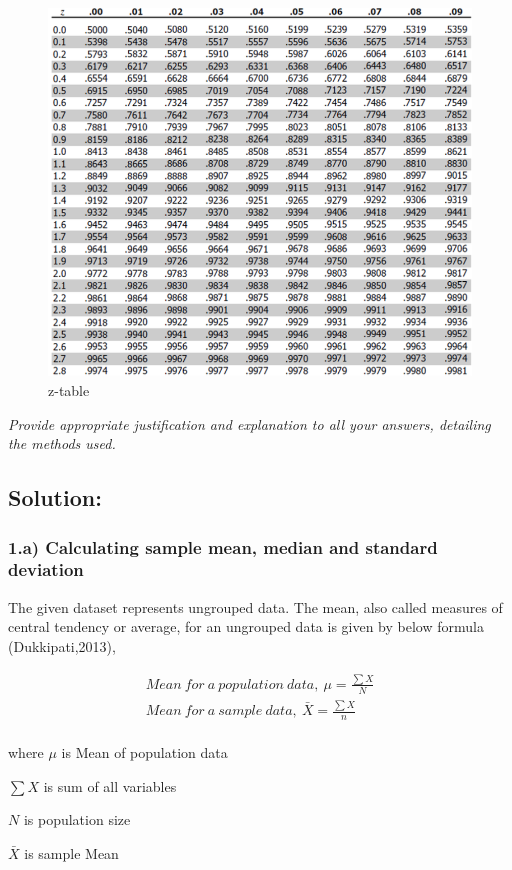 \documentclass[a4paper]{report}
\begin{document}
\begin{figure}[h]
    \centering
    \includegraphics[width=0.75\linewidth]{z-table.png}
    \caption{z-table}
    \label{fig:enter-label}
\end{figure}

\textit{Provide appropriate justification and explanation to all your answers, detailing the methods used.}

\subsection*{Solution:}

\subsubsection*{1.a) Calculating sample mean, median and standard deviation}

The given dataset represents ungrouped data. 
The mean, also called measures of central tendency or average, for an ungrouped data is given by below formula (Dukkipati,2013),

\begin{align*}
    Mean\ for\ a\ population\ data,\ \mu = \frac{\sum X}{N} \\
    Mean\ for\ a\ sample\ data,\ \bar{X} = \frac{\sum X}{n} \\
\end{align*}

where $\mu$ is Mean of population data

$\sum X$ is sum of all variables

$N$ is population size

$\bar{X}$ is sample Mean
\end{document}
